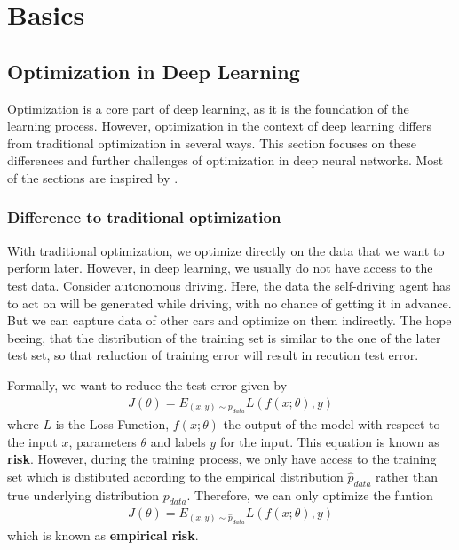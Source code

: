 \chapter{Basics}

\section{Optimization in Deep Learning}
Optimization is a core part of deep learning, as it is the
foundation of the learning process. However, optimization in the context of deep
learning differs from traditional optimization in several ways. This section
focuses on these differences and further challenges of optimization in
deep neural networks. Most of the sections are inspired by
\cite{Goodfellow-et-al-2016}.

\subsection{Difference to traditional optimization}\label{sub:1} 
With traditional optimization, we optimize directly on the data that we want to
perform later. However, in deep learning, we usually do not have access to the
test data. Consider autonomous driving. Here, the data the self-driving agent
has to act on will be generated while driving, with no chance of getting it in
advance. But we can capture data of other cars and optimize on them indirectly.
The hope beeing, that the distribution of the training set is similar to the one
of the later test set, so that reduction of training error will result in recution
test error.

Formally, we want to reduce the test error given by
\begin{align}\label{eq:1}
    J(\theta) = E_{(x,y)\sim p_{data}} L(f(x;\theta), y)
\end{align}
where $L$ is the Loss-Function, $f(x;\theta)$ the output of the model with
respect to the input $x$, parameters $\theta$ and labels $y$ for the
input. This equation is known as \textbf{risk}. However, during the training
process, we only have access to the training set which is distibuted according
to the empirical distribution $\hat{p}_{data}$ rather than true underlying
distribution $p_{data}$. Therefore, we can only optimize the funtion
\begin{align}
    J(\theta) = E_{(x,y)\sim \hat{p}_{data}} L(f(x;\theta), y)
\end{align}
which is known as \textbf{empirical risk}.

